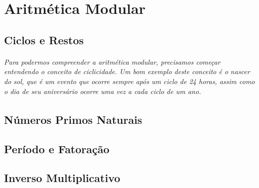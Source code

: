 \chapter {Aritm\'{e}tica Modular}
\label{Mod}

\section{Ciclos e Restos}	
\subparagraph{
Para podermos compreender a aritm\'etica modular, precisamos come\c{c}ar entendendo o conceito de ciclicidade. Um bom exemplo deste conceito \'e o nascer do sol, que \'e um evento que ocorre sempre ap\'os um ciclo de {24} horas, assim como o dia de seu anivers\'ario ocorre uma vez a cada ciclo de um ano.
}

\section{N\'{u}meros Primos Naturais}	

\section{Per\'{i}odo e Fatora\c{c}\~{a}o}

\section{Inverso Multiplicativo}
